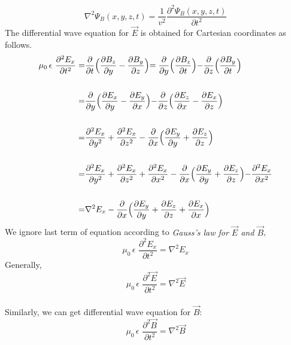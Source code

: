 \documentclass[12pt]{article}
\numberwithin{equation}{section}
\begin{document}
\[
    \nabla^2 \Psi_B(x,y,z,t)=\frac{1}{v^2}\frac{\partial^2{\Psi_B(x,y,z,t)}}{\partial{t^2}}
\]
The differential wave equation for $\vec{E}$ is obtained for Cartesian coordinates as follows.
\[
\begin{split}  
    \mu_0\,\epsilon\,\,\frac{\partial^2{E_x}}{\partial{t^2}}=&\frac{\partial}{\partial{t}}\Bigl(\frac{\partial{B_z}}{\partial{y}}-\frac{\partial{B_y}}{\partial{z}}\Bigl)=\frac{\partial}{\partial{y}}\Bigl(\frac{\partial{B_z}}{\partial{t}}\Bigl)-\frac{\partial}{\partial{z}}\Bigl(\frac{\partial{B_y}}{\partial{t}}\Bigl)\\
    \\
    =&\frac{\partial}{\partial{y}}\Bigl(\frac{\partial{E_x}}{\partial{y}}-\frac{\partial{E_y}}{\partial{x}}\Bigl)-\frac{\partial}{\partial{z}}\Bigl(\frac{\partial{E_z}}{\partial{x}}-\frac{\partial{E_x}}{\partial{z}}\Bigl)\\
    \\
    =&\frac{\partial^2{E_x}}{\partial{y^2}}+\frac{\partial^2{E_x}}{\partial{z^2}}-\frac{\partial}{\partial{x}}\Bigl(\frac{\partial{E_y}}{\partial{y}}+\frac{\partial{E_z}}{\partial{z}}\Bigl)\\
    \\
    =&\frac{\partial^2{E_x}}{\partial{y^2}}+\frac{\partial^2{E_x}}{\partial{z^2}}+\frac{\partial^2{E_x}}{\partial{x^2}}-\frac{\partial}{\partial{x}}\Bigl(\frac{\partial{E_y}}{\partial{y}}+\frac{\partial{E_z}}{\partial{z}}\Bigl)-\frac{\partial^2{E_x}}{\partial{x^2}}\\
    \\
    =&\nabla^2{E_x}-\frac{\partial}{\partial{x}}\Bigl(\frac{\partial{E_y}}{\partial{y}}+\frac{\partial{E_z}}{\partial{z}}+\frac{\partial{E_x}}{\partial{x}}\Bigl)
\end{split}
\]
We ignore last term of equation according to \emph{Gauss's law for $\vec{E}$ and $\vec{B}$},
\[
    \mu_0\,\epsilon\,\,\frac{\partial^2{E_x}}{\partial{t^2}}=\nabla^2{E_x}
\]
Generally,
\begin{equation}
    \mu_0\,\epsilon\,\,\frac{\partial^2{\vec{E}}}{\partial{t^2}}=\nabla^2{\vec{E}}\label{21}
\end{equation}
\\
Similarly, we can get differential wave equation for $\vec{B}$:
\begin{equation}
    \mu_0\,\epsilon\,\,\frac{\partial^2{\vec{B}}}{\partial{t^2}}=\nabla^2{\vec{B}}\label{22}
\end{equation}
\end{document}
